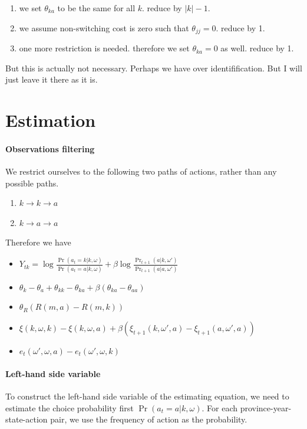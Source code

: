 \documentclass[12pt]{article}[margin=1in]
\begin{document}
\begin{enumerate}
    \item we set $\theta_{ka}$ to be the same for all $k$. reduce by $|k|-1$.
    \item we assume non-switching cost is zero such that $\theta_{jj}=0$. reduce by 1.
    \item one more restriction is needed. therefore we set $\theta_{ka}=0$ as well. reduce by 1.
\end{enumerate}

But this is actually not necessary. Perhaps we have over identifification. But I will just leave it there as it is.






\section{Estimation}

\paragraph{Observations filtering}
We restrict ourselves to the following two paths of actions, rather than any possible paths. 
\begin{enumerate}
    \item $k\to k\to a$
    \item $k\to a \to a$
\end{enumerate}

Therefore we have
\begin{itemize}
    \item $Y_{tk}  = \log \frac{\Pr(a_t = k | k, \omega)}{\Pr(a_t = a | k, \omega)} + \beta \log \frac{\Pr_{t+1}(a | k, \omega')}{\Pr_{t+1}(a | a, \omega')}$
    \item $\theta_k-\theta_a + \theta_{kk} - \theta_{ka} + \beta(\theta_{ka}-\theta_{aa})$
    \item $\theta_R(R(m,a) - R(m,k))$
    \item $\xi(k, \omega,k) - \xi(k, \omega,a) + \beta(\xi_{t+1}(k, \omega',a) - \xi_{t+1}(a, \omega',a))$
    \item $e_t(\omega',\omega, a) - e_t(\omega',\omega, k)$
\end{itemize}

\paragraph{Left-hand side variable}
To construct the left-hand side variable of the estimating equation, we need to estimate the choice probability first $\Pr(a_t = a | k, \omega)$.
For each province-year-state-action pair, we use the frequency of action as the probability.
\end{document}

